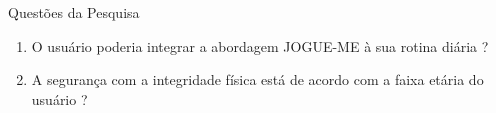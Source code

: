 \documentclass{beamer}
\begin{document}
\begin{frame}{Questões da Pesquisa} 
    \begin{block}{}
			\begin{enumerate}
				\item O usuário poderia integrar a abordagem JOGUE-ME à sua rotina diária ?
				\item A segurança com a integridade física está de acordo com a faixa etária do usuário ?
			\end{enumerate}
    \end{block}
\end{frame}


\end{document}
